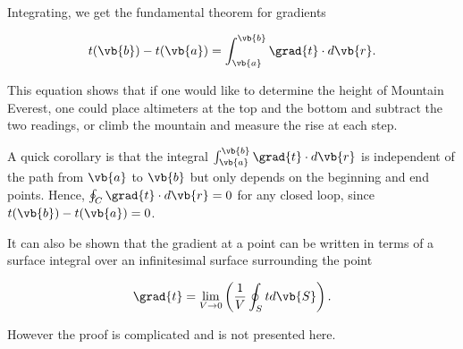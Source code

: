 \documentclass[english,a4paper,12pt]{report}
\begin{document}

	
Integrating, we get the fundamental theorem for gradients

\begin{equation} 
	t(\vb{b}) - t(\vb{a}) = \int_{\vb{a}}^{\vb{b}} \grad{t} \cdot d\vb{r}. 
\end{equation}
	
This equation shows that if one would like to determine the height of Mountain Everest, one could place altimeters at the top and the bottom and subtract the two readings, or climb the mountain and measure the rise at each step.

A quick corollary is that the integral \(\int_{\vb{a}}^{\vb{b}} \grad{t} \cdot d\vb{r}\) is independent of the path from \(\vb{a}\) to \(\vb{b}\) but only depends on the beginning and end points. Hence, \(\oint_{C} \grad{t} \cdot d\vb{r} = 0\) for any closed loop, since \(t(\vb{b}) - t(\vb{a}) = 0\).
	
It can also be shown that the gradient at a point can be written in terms of a surface integral over an infinitesimal surface surrounding the point

\begin{equation}
	\grad{t } = \lim_{V \to 0} \left( \frac{1}{V} \oint_{S} t  d\vb{S}  \right).
\end{equation}

However the proof is complicated and is not presented here.
\end{document}
